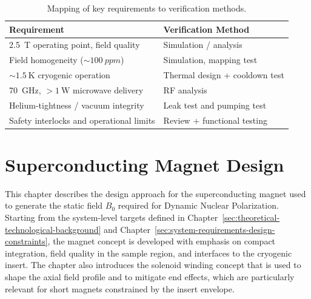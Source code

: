 \documentclass[FM,DP,EN,twoside]{tulthesis}
\begin{document}
\begin{table}[h]
  \centering
  \caption[Verification Strategy Mapping]{Mapping of key requirements to verification methods.}
  \label{table:verification-strategy}
  \begin{tabular}{|l|l|}
    \hline
    \textbf{Requirement} & \textbf{Verification Method} \\
    \hline
    \SI{2.5}{\tesla} operating point, field quality & Simulation / analysis \\
    \hline
    Field homogeneity ($\sim \SI{100}{ppm}$) & Simulation, mapping test \\
    \hline
    $\sim \SI{1.5}{\kelvin}$ cryogenic operation & Thermal design + cooldown test \\
    \hline
    \SI{70}{\giga\hertz}, $> \SI{1}{\watt}$ microwave delivery & RF analysis \\
    \hline
    Helium-tightness / vacuum integrity & Leak test and pumping test \\
    \hline
    Safety interlocks and operational limits & Review + functional testing \\
    \hline
  \end{tabular}
\end{table}


\chapter{Superconducting Magnet Design}
\label{sec:superconducting-magnet-design}

This chapter describes the design approach for the superconducting magnet used to generate the static field $B_0$ required for Dynamic Nuclear Polarization. Starting from the system-level targets defined in Chapter~\ref{sec:theoretical-technological-background} and Chapter~\ref{sec:system-requirements-design-constraints}, the magnet concept is developed with emphasis on compact integration, field quality in the sample region, and interfaces to the cryogenic insert. The chapter also introduces the solenoid winding concept that is used to shape the axial field profile and to mitigate end effects, which are particularly relevant for short magnets constrained by the insert envelope.
\end{document}
